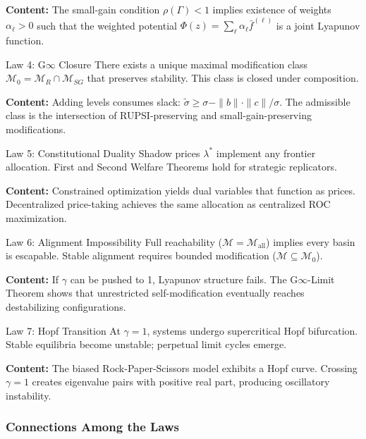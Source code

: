 \documentclass[12pt]{article}
\begin{document}
\noindent\textbf{Content:} The small-gain condition $\rho(\Gamma) < 1$ implies existence of weights $\alpha_\ell > 0$ such that the weighted potential $\Phi(z) = \sum_\ell \alpha_\ell \bar{f}^{(\ell)}$ is a joint Lyapunov function.

\begin{lawbox}{Law 4: G$\infty$ Closure}
There exists a unique maximal modification class $\mathcal{M}_0 = \mathcal{M}_R \cap \mathcal{M}_{SG}$ that preserves stability. This class is closed under composition.
\end{lawbox}

\noindent\textbf{Content:} Adding levels consumes slack: $\tilde{\sigma} \geq \sigma - \|b\| \cdot \|c\| / \sigma$. The admissible class is the intersection of RUPSI-preserving and small-gain-preserving modifications.

\begin{lawbox}{Law 5: Constitutional Duality}
Shadow prices $\lambda^*$ implement any frontier allocation. First and Second Welfare Theorems hold for strategic replicators.
\end{lawbox}

\noindent\textbf{Content:} Constrained optimization yields dual variables that function as prices. Decentralized price-taking achieves the same allocation as centralized ROC maximization.

\begin{lawbox}{Law 6: Alignment Impossibility}
Full reachability ($\mathcal{M} = \mathcal{M}_{\text{all}}$) implies every basin is escapable. Stable alignment requires bounded modification ($\mathcal{M} \subseteq \mathcal{M}_0$).
\end{lawbox}

\noindent\textbf{Content:} If $\gamma$ can be pushed to 1, Lyapunov structure fails. The G$\infty$-Limit Theorem shows that unrestricted self-modification eventually reaches destabilizing configurations.

\begin{lawbox}{Law 7: Hopf Transition}
At $\gamma = 1$, systems undergo supercritical Hopf bifurcation. Stable equilibria become unstable; perpetual limit cycles emerge.
\end{lawbox}

\noindent\textbf{Content:} The biased Rock-Paper-Scissors model exhibits a Hopf curve. Crossing $\gamma = 1$ creates eigenvalue pairs with positive real part, producing oscillatory instability.

\subsubsection{Connections Among the Laws}
\end{document}
